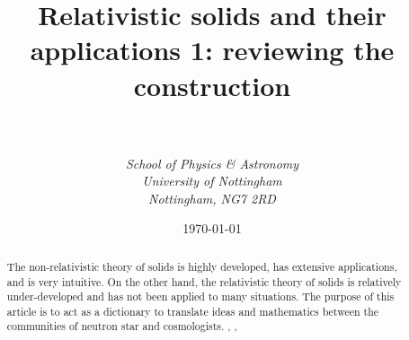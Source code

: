 \documentclass[a4paper, 12pt]{article}
\numberwithin{equation}{section}
\begin{document}
\title{\sc Relativistic solids and their applications 1: reviewing the construction}
\author{\\ \\ \it{School of Physics \& Astronomy} \\ \it{University of Nottingham} \\ \it{Nottingham, NG7 2RD} }

\date{\today}



\maketitle
\begin{abstract}
The non-relativistic theory of solids is highly developed, has extensive applications, and is very intuitive. On the other hand, the relativistic theory of solids is relatively under-developed and has not been applied to many situations. The purpose of this article is to act as a dictionary to translate ideas and mathematics between the communities of neutron star and cosmologists. , , 
\end{abstract}
\tableofcontents

\clearpage
{}


\end{document}
